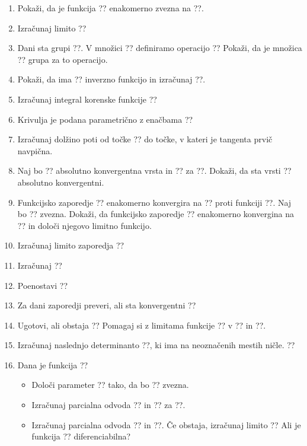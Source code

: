 \documentclass[a4paper,12pt]{article}
\begin{document}
\begin{enumerate}
\item Pokaži, da je funkcija ?? enakomerno zvezna na ??.

\item Izračunaj limito
??

\item Dani sta grupi ??. V množici ?? definiramo operacijo
??
Pokaži, da je množica ?? grupa za to operacijo.

\item Pokaži, da ima ?? inverzno funkcijo in izračunaj ??.

\item Izračunaj integral korenske funkcije
??

\item Krivulja je podana parametrično z enačbama
??
\item Izračunaj dolžino poti od točke ?? do točke, v kateri je tangenta prvič navpična.

\item Naj bo ?? absolutno konvergentna vrsta in ?? za ??.
Dokaži, da sta vrsti
??
absolutno konvergentni.

\item Funkcijsko zaporedje ?? enakomerno konvergira na ?? proti funkciji ??.
Naj bo ?? zvezna. Dokaži, da funkcijsko zaporedje ??
enakomerno konvergina na ?? in določi njegovo limitno funkcijo.

\item Izračunaj limito zaporedja
??

\item Izračunaj
??

\item Poenostavi
??

\item Za dani zaporedji preveri, ali sta konvergentni
??

\item Ugotovi, ali obstaja
??
Pomagaj si z limitama funkcije ?? v ?? in ??.

\item Izračunaj naslednjo determinanto ??, ki ima na neoznačenih mestih ničle.
??

\item Dana je funkcija
??

\begin{itemize}
\item Določi parameter ?? tako, da bo ?? zvezna.
\item Izračunaj parcialna odvoda ?? in ?? za ??.
\item Izračunaj parcialna odvoda ?? in ??.
Če obstaja, izračunaj limito
??
Ali je funkcija ?? diferenciabilna?
\end{itemize}


\end{enumerate}
\end{document}
